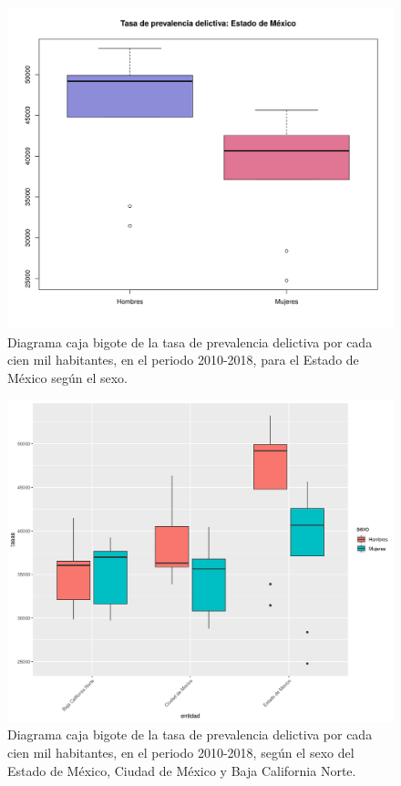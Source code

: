 \documentclass[12pt]{article}
\begin{document}
\begin{figure}
	\centering
	\includegraphics[scale=0.4]{edomex.png}
	\caption{Diagrama caja bigote de la tasa de prevalencia delictiva por cada cien mil habitantes, en el periodo 2010-2018, para el Estado de México según el sexo.}
	\label{vic.edomex}
\end{figure}

\begin{figure}
	\centering
	\includegraphics[scale=0.4]{delitos_sexo.png}
	\caption{Diagrama caja bigote de la tasa de prevalencia delictiva por cada cien mil habitantes, en el periodo 2010-2018, según el sexo del Estado de México, Ciudad de México y Baja California Norte.}
	\label{principales}
\end{figure}

\nocite{*}


\end{document}
